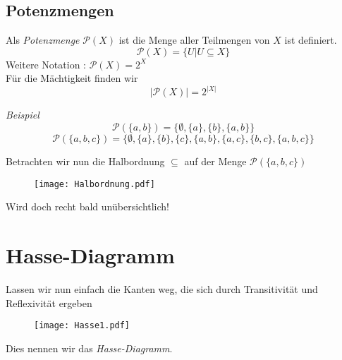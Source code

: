 \subsection{Potenzmengen}
\begin{frame}
	\begin{Definition}
		Als \emph{Potenzmenge} $\mathcal{P}(X)$ ist die Menge aller Teilmengen von $X$ ist definiert. $$ \mathcal{P}(X) = \{ U | U\subseteq X\} $$
		Weitere Notation : $ \mathcal{P}(X) = 2^X $ \\
		
		Für die Mächtigkeit finden wir $$ \vert \mathcal{P}(X) \vert = 2^{\vert X \vert} $$
	\end{Definition} 
	\pause 
	\emph{Beispiel}
	$$ \mathcal{P}(\{a,b\}) = \{ \emptyset, \{a\}, \{b\}, \{a,b\} \} $$
	\pause
	$$\mathcal{P}(\{a,b,c\}) = \{ \emptyset, \{a\}, \{b\}, \{c\}, \{a,b\}, \{a,c\}, \{b,c\}, \{a,b,c\} \} $$
\end{frame}

\begin{frame}
	Betrachten wir nun die Halbordnung $\subseteq$ auf der Menge $\mathcal{P}(\{a,b,c\})$ \pause
	\begin{figure}[H]
		\centering
		\texttt{[image: Halbordnung.pdf]}
	\end{figure} \pause
	Wird doch recht bald unübersichtlich!
\end{frame}

\section{Hasse-Diagramm}
\begin{frame}
Lassen wir nun einfach die Kanten weg, die sich durch Transitivität und Reflexivität ergeben \pause
\begin{figure}[H]
	\centering
	\texttt{[image: Hasse1.pdf]}
\end{figure} \pause
Dies nennen wir das \emph{Hasse-Diagramm}.
\end{frame}

